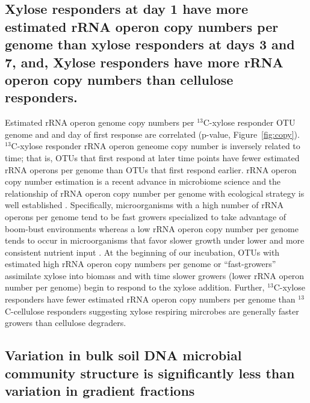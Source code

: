 \subsection{Xylose responders at day 1 have more estimated rRNA operon copy numbers per genome
than xylose responders at days 3 and 7, and, Xylose responders have more rRNA operon copy numbers
than cellulose responders.}
Estimated rRNA operon genome copy numbers per $^{13}$C-xylose responder OTU
genome and and day of first response are correlated (p-value,
Figure~\ref{fig:copy}). $^{13}$C-xylose responder rRNA operon geneome copy
number is inversely related to time; that is, OTUs that first respond at later
time points have fewer estimated rRNA operons per genome than OTUs that first
respond earlier. rRNA operon copy number estimation is a recent advance in
microbiome science \citep{Kembel_2012} and the relationship of rRNA operon copy
number per genome with ecological strategy is well established
\citep{Klappenbach_2000}. Specifically, microorganisms with a high number of
rRNA operons per genome tend to be fast growers specialized to take advantage
of boom-bust environments whereas a low rRNA operon copy number per genome
tends to occur in microorganisms that favor slower growth under lower and more
consistent nutrient input \citep{Klappenbach_2000}. At the beginning of our
incubation, OTUs with estimated high rRNA operon copy numbers per genome or
``fast-growers'' assimilate xylose into biomass and with time slower growers
(lower rRNA operon number per genome) begin to respond to the xylose addition.
Further, $^{13}$C-xylose responders have fewer estimated rRNA operon copy
numbers per genome than $^{13}$C-cellulose responders suggesting xylose
respiring mircrobes are generally faster growers than cellulose degraders.


\subsection{Variation in bulk soil DNA microbial community structure is significantly less
than variation in gradient fractions} 
